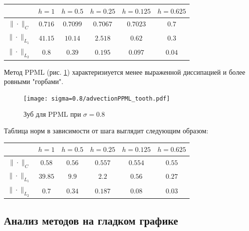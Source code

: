 \documentclass[12pt,a4paper]{article}
\newcommand{\picref}[1]{рис. \ref{#1}}
\begin{document}
    \begin{center}
        \begin{tabular}{ |c|c|c|c|c|c| } 
         \hline
         & $ h=1 $ &  $ h=0.5$ &  $ h=0.25 $ &  $ h=0.125 $ &  $ h=0.625 $ \\ 
         \hline 
         $\| \cdot \|_{C}$ & $0.716$ & $0.7099$ & $0.7067$ & $0.7023$ & $0.7$
         \\
         \hline
         $\| \cdot \|_{L_1}$ & $41.15$ & $10.14$ & $2.518$ & $0.62$ & $0.3$
         \\
         \hline
         $\| \cdot \|_{L_2}$ & $0.8$ & $0.39$ & $0.195$ & $0.097$ & $0.04$
         \\
         \hline
        \end{tabular}
    \end{center}

    \pagebreak

    Метод PPML (\picref{fig:ppml_tooth_08}) характеризиуется менее выраженной диссипацией и более ровными "горбами". 

    \begin{figure}[h]
        \centering
        \texttt{[image: sigma=0.8/advectionPPML\_tooth.pdf]}
        \caption{Зуб для PPML при $ \sigma = 0.8 $}
        \label{fig:ppml_tooth_08}
    \end{figure}

    Таблица норм в зависимости от шага выглядит следующим образом:

    \begin{center}
        \begin{tabular}{ |c|c|c|c|c|c| } 
         \hline
         & $ h=1 $ &  $ h=0.5$ &  $ h=0.25 $ &  $ h=0.125 $ &  $ h=0.625 $ 
         \\ 
         \hline
         $\| \cdot \|_{C}$ & $0.58$ & $0.56$ & $0.557$ & $0.554$ & $0.55$ 
         \\
         \hline
         $\| \cdot \|_{L_1}$ & $39.85$ & $9.9$ & $2.2$ & $0.56$ & $0.27$
         \\
         \hline
         $\| \cdot \|_{L_2}$ & $0.7$ & $0.34$ & $0.187$ & $0.08$ & $0.03$ 
         \\
         \hline
        \end{tabular}
    \end{center}

    \subsection{Анализ методов на гладком графике}
\end{document}
